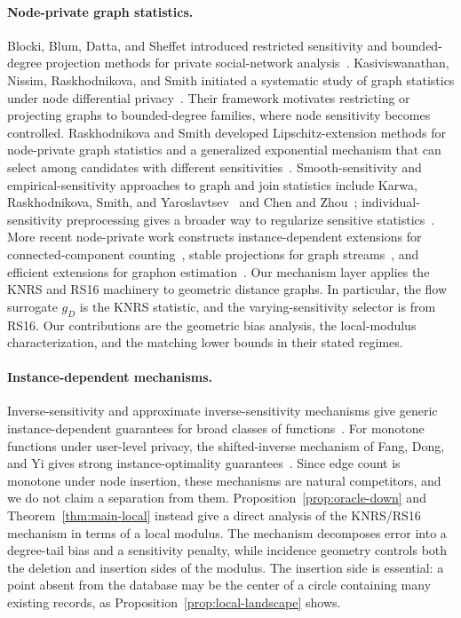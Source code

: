 \documentclass[11pt]{article}
\begin{document}
\paragraph{Node-private graph statistics.}
Blocki, Blum, Datta, and Sheffet introduced restricted sensitivity and bounded-degree projection methods for private social-network analysis~\cite{BBDS13}. Kasiviswanathan, Nissim, Raskhodnikova, and Smith initiated a systematic study of graph statistics under node differential privacy~\cite{KNRS13}. Their framework motivates restricting or projecting graphs to bounded-degree families, where node sensitivity becomes controlled.
Raskhodnikova and Smith developed Lipschitz-extension methods for node-private graph statistics and a generalized exponential mechanism that can select among candidates with different sensitivities~\cite{RS16}. Smooth-sensitivity and empirical-sensitivity approaches to graph and join statistics include Karwa, Raskhodnikova, Smith, and Yaroslavtsev~\cite{KRSY14} and Chen and Zhou~\cite{ChenZhou13}; individual-sensitivity preprocessing gives a broader way to regularize sensitive statistics~\cite{CummingsDurfee20}. More recent node-private work constructs instance-dependent extensions for connected-component counting~\cite{KalemajRST23}, stable projections for graph streams~\cite{JainSmithWagaman24}, and efficient extensions for graphon estimation~\cite{ChenEtAl24Graphon}. Our mechanism layer applies the KNRS and RS16 machinery to geometric distance graphs. In particular, the flow surrogate \(g_D\) is the KNRS statistic, and the varying-sensitivity selector is from RS16. Our contributions are the geometric bias analysis, the local-modulus characterization, and the matching lower bounds in their stated regimes.

\paragraph{Instance-dependent mechanisms.}
Inverse-sensitivity and approximate inverse-sensitivity mechanisms give generic instance-dependent guarantees for broad classes of functions~\cite{AsiDuchi20}. For monotone functions under user-level privacy, the shifted-inverse mechanism of Fang, Dong, and Yi gives strong instance-optimality guarantees~\cite{FDY22}. Since edge count is monotone under node insertion, these mechanisms are natural competitors, and we do not claim a separation from them. Proposition~\ref{prop:oracle-down} and Theorem~\ref{thm:main-local} instead give a direct analysis of the KNRS/RS16 mechanism in terms of a local modulus. The mechanism decomposes error into a degree-tail bias and a sensitivity penalty, while incidence geometry controls both the deletion and insertion sides of the modulus. The insertion side is essential: a point absent from the database may be the center of a circle containing many existing records, as Proposition~\ref{prop:local-landscape} shows.
\end{document}

